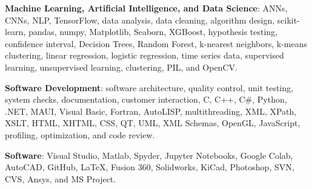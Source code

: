 \documentclass{leresume}
\begin{document}
    \begin{bulletedlist}
		
		\item \textbf{Machine Learning, Artificial Intelligence, and Data Science}: ANNs,
                        CNNs,
                        NLP,
                        TensorFlow,
                        data analysis,
                        data cleaning,
                        algorithm design,
                        scikit-learn,
                        pandas,
                        numpy,
                        Matplotlib,
                        Seaborn,
                        XGBoost,
                        hypothesis testing,
                        confidence interval,
                        Decision Trees,
                        Random Forest,
                        k-nearest neighbors,
                        k-means clustering,
                        linear regression,
                        logistic regression,
                        time series data,
                        supervised learning,
                        unsupervised learning,
                        clustering,
                        PIL,
                        and OpenCV.
                        
		\item \textbf{Software Development}: software architecture,
                        quality control,
                        unit testing,
                        system checks,
                        documentation,
                        customer interaction,
                        C,
                        C++,
                        C\#,
                        Python,
                        .NET,
                        MAUI,
                        Visual Basic,
                        Fortran,
                        AutoLISP,
                        multithreading,
                        XML,
                        XPath,
                        XSLT,
                        HTML,
                        XHTML,
                        CSS,
                        QT,
                        UML,
                        XML Schemas,
                        OpenGL,
                        JavaScript,
                        profiling,
                        optimization,
                        and code review.
                        
		\item \textbf{Software}: Visual Studio,
                        Matlab,
                        Spyder,
                        Jupyter Notebooks,
                        Google Colab,
                        AutoCAD,
                        GitHub,
                        LaTeX,
                        Fusion 360,
                        Solidworks,
                        KiCad,
                        Photoshop,
                        SVN,
                        CVS,
                        Ansys,
                        and MS Project.
                        

\end{bulletedlist}
\end{document}
